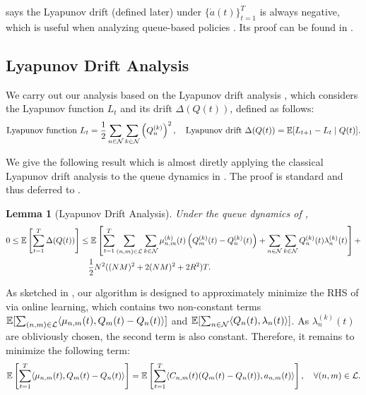 \documentclass[11pt,fullpage,letterpaper]{article} %
\newtheorem{lemma}[theorem]{Lemma}
\renewcommand{\bm}[1]{#1}%
\newcommand{\E}{\operatornamewithlimits{\mathbb{E}}}
\newcommand{\mN}{{\mathcal N}}
\newcommand{\mL}{{\mathcal L}}
\begin{document}
 says the Lyapunov drift (defined later) under $\{\mathring{\bm a}(t)\}_{t=1}^T$ is always negative, which is useful when analyzing queue-based policies \citep[\S 3.1]{neely2010stochastic}. Its proof can be found in .

\subsection{Lyapunov Drift Analysis}\label{sec:multi-hop stability Lyapunov}
We carry out our analysis based on the Lyapunov drift analysis \citep[\S 4]{neely2010stochastic}, which considers the Lyapunov function $L_t$ and its drift $\Delta(\bm Q(t))$, defined as follows:
\begin{equation*}
\text{Lyapunov function }L_t=\frac 12 \sum_{n\in \mN} \sum_{k\in \mN} \left (Q_{n}^{(k)}\right )^2,\quad \text{Lyapunov drift } \Delta(\bm Q(t)) = \E[L_{t+1} - L_t \mid \bm Q(t)].
\end{equation*}

We give the following result which is almost diretly applying the classical Lyapunov drift analysis to the queue dynamics in . The proof is standard and thus deferred to .
\begin{lemma}[Lyapunov Drift Analysis]\label{lem:multi-hop stability Lyapunov}
Under the queue dynamics of ,
\begin{align}
0\le \E\left [\sum_{t=1}^T \Delta(\bm Q(t))\right ]&\le \E\left [\sum_{t=1}^T \sum_{(n,m)\in \mL} \sum_{k\in \mN} \mu_{n,m}^{(k)}(t)\left (Q_m^{(k)}(t)-Q_n^{(k)}(t)\right ) + \sum_{n\in \mN} \sum_{k\in \mN} Q_n^{(k)}(t) \lambda_n^{(k)}(t)\right ] + \nonumber \\
&\quad \frac 12 N^2 ((NM)^2+2(NM)^2+2R^2) T. \label{eq:multi-hop stability Lyapunov}
\end{align}
\end{lemma}

As sketched in , our algorithm is designed to approximately  minimize the RHS of  via online learning, which contains two non-constant terms $\E[\sum_{(n,m)\in \mL}\langle \bm \mu_{n,m}(t),\bm Q_m(t)-\bm Q_n(t)\rangle]$ and $\E[\sum_{n\in \mN} \langle \bm Q_n(t), \bm \lambda_n(t)\rangle]$.
As $\lambda_n^{(k)}(t)$ are obliviously chosen, the second term is also constant. Therefore, it remains to minimize the following term: 
\begin{equation}\label{eq:multi-hop OLO objective}
\E\left [\sum_{t=1}^T \langle \bm \mu_{n,m}(t),\bm Q_m(t)-\bm Q_n(t)\rangle\right ]=\E\left [\sum_{t=1}^T \langle C_{n,m}(t) (\bm Q_m(t)-\bm Q_n(t)), \bm a_{n,m}(t)\rangle\right ],\quad \forall (n,m)\in \mL.
\end{equation}
\end{document}
